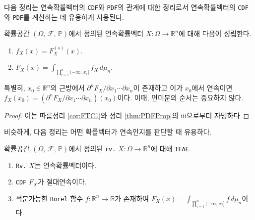 다음 정리는 연속확률벡터의 \texttt{CDF}와 \texttt{PDF}의 관계에 대한 정리로서 연속확률벡터의 \texttt{CDF}와 \texttt{PDF}를 계산하는 데 유용하게 사용된다.

\begin{theorem}\label{thm:CDFPDFRel}
    확률공간 $(\Omega,\,\mathcal{F},\,\mathbb{P})$에서 정의된 연속확률벡터 $X:\Omega\to\mathbb{R}^n$에 대해 다음이 성립한다.
    \begin{enumerate}
        \item $f_X(x)=F_X^{(s)}(x)$.
        \item $F_X(x)=\int_{\prod_{i=1}^n(-\infty,\,x_i]}f_X\,d\mu_n$.
    \end{enumerate}
    특별히, $x_0\in\mathbb{R}^n$의 근방에서 $\partial^nF_X/\partial x_1\cdots\partial x_n$이 존재하고 이가 $x_0$에서 연속이면 $f_X(x_0)=(\partial^nF_X/\partial x_1\cdots\partial x_n)(x_0)$이다. 이때, 편미분의 순서는 중요하지 않다.
\end{theorem}

\begin{proof}
    이는 따름정리 \ref{cor:FTC1}와 정리 \ref{thm:PDFProp}의 iii으로부터 자명하다
\end{proof}

비슷하게, 다음 정리는 어떤 확률벡터가 연속인지를 판단할 때 유용하다.

\begin{theorem}
    확률공간 $(\Omega,\,\mathcal{F},\,\mathbb{P})$에서 정의된 \texttt{rv.} $X:\Omega\to\mathbb{R}^n$에 대해 \texttt{TFAE}.
    \begin{enumerate}
        \item \texttt{Rv.} $X$는 연속확률벡터이다.
        \item \texttt{CDF} $F_X$가 절대연속이다.
        \item 적분가능한 \texttt{Borel} 함수 $f:\mathbb{R}^n\to\overline{\mathbb{R}}$가 존재하여 $F_X(x)=\int_{\prod_{i=1}^n(-\infty,\,x_i]}f\,d\mu_n$이다.
    \end{enumerate}
\end{theorem}

